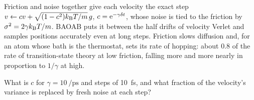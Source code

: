 \begin{keyidea}
Friction and noise together give each velocity the exact step $v
\leftarrow cv + \sqrt{(1 - c^2)k_{\mathrm{B}} T/m}\,g$, $c = \mathrm{e}^{-\gamma\delta t}$,
whose noise is tied to the friction by $\sigma^2 = 2\gamma k_{\mathrm{B}} T/m$. BAOAB
puts it between the half drifts of velocity Verlet and samples positions
accurately even at long steps. Friction slows diffusion and, for an atom
whose bath is the thermostat, sets its rate of hopping: about 0.8 of the
rate of transition-state theory at low friction, falling more and more
nearly in proportion to $1/\gamma$ at high.
\end{keyidea}


\begin{selfcheck}
What is $c$ for $\gamma = \SI{10}{\per\pico\second}$ and steps of
\SI{10}{\femto\second}, and what fraction of the velocity's variance is
replaced by fresh noise at each step?
\end{selfcheck}
